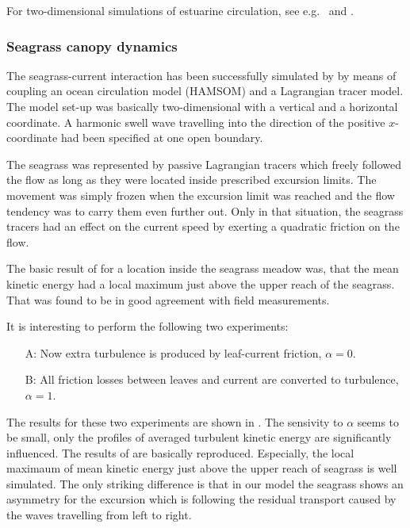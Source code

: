 For two-dimensional simulations of estuarine circulation,
see e.g.\ \cite{BurchardBaumert98} and \cite{Burchardetal2003}.


\subsubsection{Seagrass canopy dynamics}\label{seagrass}


The seagrass-current interaction has been successfully simulated
by \cite{VerduinBackhaus2000} by means of coupling an
ocean circulation model (HAMSOM) and a Lagrangian tracer model. 
The model set-up was basically two-dimensional with a vertical and
a horizontal coordinate. A harmonic swell wave travelling into the
direction of the positive $x$-coordinate had been specified at one open
boundary. 

The seagrass was represented by passive Lagrangian tracers which freely
followed the flow as long as they were located inside prescribed
excursion limits. The movement was simply frozen when the excursion limit
was reached and the flow tendency was to carry them even further out. 
Only in that situation, the seagrass tracers had an effect on the current speed
by exerting a quadratic friction on the flow. 

The basic result of \cite{VerduinBackhaus2000}
for a location inside the seagrass meadow was, that the mean kinetic energy
had a local maximum just above the upper reach of the seagrass. That was
found to be in good agreement with field measurements.  

It is interesting to perform the following two experiments:

\begin{itemize}
\item[A:] Now extra turbulence is produced by leaf-current friction,
$\alpha=0$. 
\item[B:] All friction losses between leaves and current are
converted to turbulence, 
$\alpha=1$. 
\end{itemize} 

The results for these two experiments are shown in \cite{BurchardBolding2000}.
The sensivity to $\alpha$ seems to be small, only the profiles
of averaged turbulent kinetic energy are significantly influenced. 
The results of \cite{VerduinBackhaus2000} are basically
reproduced. 
Especially, the local maximaum of mean kinetic energy just above the upper
reach of seagrass is well simulated. 
The only striking difference is that in our model the
seagrass shows an asymmetry for the excursion which is following the residual  
transport caused by the waves travelling from left to right. 
\\

